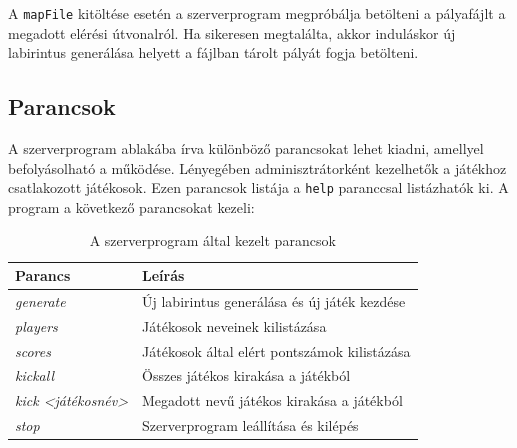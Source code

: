 A \verb|mapFile| kitöltése esetén a szerverprogram megpróbálja betölteni a pályafájlt a megadott elérési útvonalról. Ha sikeresen megtalálta, akkor induláskor új labirintus generálása helyett a fájlban tárolt pályát fogja betölteni.

\newpage

\subsection{Parancsok}

A szerverprogram ablakába írva különböző parancsokat lehet kiadni, amellyel befolyásolható a működése. Lényegében adminisztrátorként kezelhetők a játékhoz csatlakozott játékosok. Ezen parancsok listája a \verb|help| paranccsal listázhatók ki. A program a következő parancsokat kezeli:

\begin{table}[H]
	\centering
	\begin{tabular}{ | m{} | m{} | }
		\hline
		\textbf{Parancs} & \textbf{Leírás} \\
		\hline \hline
		\emph{generate} & Új labirintus generálása és új játék kezdése \\
		\hline
		\emph{players} & Játékosok neveinek kilistázása \\
		\hline
		\emph{scores} & Játékosok által elért pontszámok kilistázása \\
		\hline
		\emph{kickall} & Összes játékos kirakása a játékból \\
		\hline
		\emph{kick <játékosnév>} & Megadott nevű játékos kirakása a játékból \\
		\hline
		\emph{stop} & Szerverprogram leállítása és kilépés \\
		\hline
	\end{tabular}
	\caption{A szerverprogram által kezelt parancsok}
	\label{tab:example-1}
\end{table}